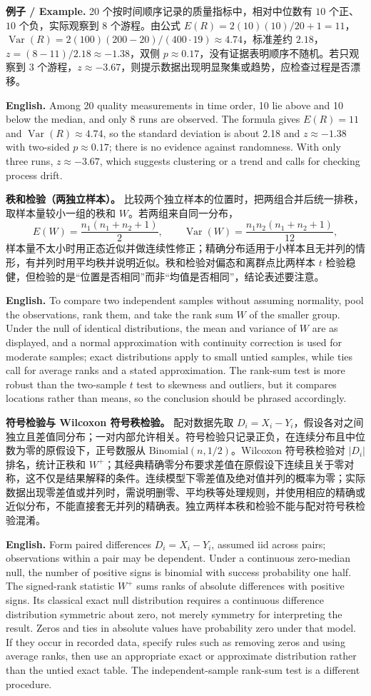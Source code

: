 \documentclass[UTF8,11pt,a4paper]{ctexart}
\newcommand{\EN}[1]{\par\noindent\textbf{English.} #1\par}
\newcommand{\EX}[2]{\par\noindent\textbf{例子 / Example.} #1\par\EN{#2}}
\begin{document}
\EX{20 个按时间顺序记录的质量指标中，相对中位数有 $10$ 个正、$10$ 个负，实际观察到 $8$ 个游程。由公式 $E(R)=2(10)(10)/20+1=11$，$\operatorname{Var}(R)=2(100)(200-20)/(400\cdot19)\approx4.74$，标准差约 $2.18$，$z=(8-11)/2.18\approx-1.38$，双侧 $p\approx0.17$，没有证据表明顺序不随机。若只观察到 $3$ 个游程，$z\approx-3.67$，则提示数据出现明显聚集或趋势，应检查过程是否漂移。}{Among 20 quality measurements in time order, 10 lie above and 10 below the median, and only 8 runs are observed. The formula gives $E(R)=11$ and $\operatorname{Var}(R)\approx4.74$, so the standard deviation is about 2.18 and $z\approx-1.38$ with two-sided $p\approx0.17$; there is no evidence against randomness. With only three runs, $z\approx-3.67$, which suggests clustering or a trend and calls for checking process drift.}

\noindent\textbf{秩和检验（两独立样本）。} 比较两个独立样本的位置时，把两组合并后统一排秩，取样本量较小一组的秩和 $W$。若两组来自同一分布，
\[
E(W)=\frac{n_1(n_1+n_2+1)}{2},\qquad
\operatorname{Var}(W)=\frac{n_1n_2(n_1+n_2+1)}{12},
\]
样本量不太小时用正态近似并做连续性修正；精确分布适用于小样本且无并列的情形，有并列时用平均秩并说明近似。秩和检验对偏态和离群点比两样本 $t$ 检验稳健，但检验的是“位置是否相同”而非“均值是否相同”，结论表述要注意。
\EN{To compare two independent samples without assuming normality, pool the observations, rank them, and take the rank sum $W$ of the smaller group. Under the null of identical distributions, the mean and variance of $W$ are as displayed, and a normal approximation with continuity correction is used for moderate samples; exact distributions apply to small untied samples, while ties call for average ranks and a stated approximation. The rank-sum test is more robust than the two-sample $t$ test to skewness and outliers, but it compares locations rather than means, so the conclusion should be phrased accordingly.}

\noindent\textbf{符号检验与 Wilcoxon 符号秩检验。} 配对数据先取 $D_i=X_i-Y_i$，假设各对之间独立且差值同分布；一对内部允许相关。符号检验只记录正负，在连续分布且中位数为零的原假设下，正号数服从 $\mathrm{Binomial}(n,1/2)$。Wilcoxon 符号秩检验对 $|D_i|$ 排名，统计正秩和 $W^+$；其经典精确零分布要求差值在原假设下连续且关于零对称，这不仅是结果解释的条件。连续模型下零差值及绝对值并列的概率为零；实际数据出现零差值或并列时，需说明删零、平均秩等处理规则，并使用相应的精确或近似分布，不能直接套无并列的精确表。独立两样本秩和检验不能与配对符号秩检验混淆。
\EN{Form paired differences $D_i=X_i-Y_i$, assumed iid across pairs; observations within a pair may be dependent. Under a continuous zero-median null, the number of positive signs is binomial with success probability one half. The signed-rank statistic $W^+$ sums ranks of absolute differences with positive signs. Its classical exact null distribution requires a continuous difference distribution symmetric about zero, not merely symmetry for interpreting the result. Zeros and ties in absolute values have probability zero under that model. If they occur in recorded data, specify rules such as removing zeros and using average ranks, then use an appropriate exact or approximate distribution rather than the untied exact table. The independent-sample rank-sum test is a different procedure.}
\end{document}
